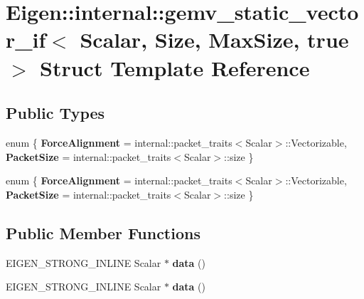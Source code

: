 \hypertarget{struct_eigen_1_1internal_1_1gemv__static__vector__if_3_01_scalar_00_01_size_00_01_max_size_00_01true_01_4}{}\section{Eigen\+:\+:internal\+:\+:gemv\+\_\+static\+\_\+vector\+\_\+if$<$ Scalar, Size, Max\+Size, true $>$ Struct Template Reference}
\label{struct_eigen_1_1internal_1_1gemv__static__vector__if_3_01_scalar_00_01_size_00_01_max_size_00_01true_01_4}
\subsection*{Public Types}
\begin{DoxyCompactItemize}
\item 
\mbox{\label{struct_eigen_1_1internal_1_1gemv__static__vector__if_3_01_scalar_00_01_size_00_01_max_size_00_01true_01_4_a79f51f46884656fafb63b74f0dd46069}} 
enum \{ {\bfseries Force\+Alignment} = internal\+:\+:packet\+\_\+traits$<$Scalar$>$\+:\+:Vectorizable, 
{\bfseries Packet\+Size} = internal\+:\+:packet\+\_\+traits$<$Scalar$>$\+:\+:size
 \}
\item 
\mbox{\label{struct_eigen_1_1internal_1_1gemv__static__vector__if_3_01_scalar_00_01_size_00_01_max_size_00_01true_01_4_a45a550706bfd47c2a79ff5f549209905}} 
enum \{ {\bfseries Force\+Alignment} = internal\+:\+:packet\+\_\+traits$<$Scalar$>$\+:\+:Vectorizable, 
{\bfseries Packet\+Size} = internal\+:\+:packet\+\_\+traits$<$Scalar$>$\+:\+:size
 \}
\end{DoxyCompactItemize}
\subsection*{Public Member Functions}
\begin{DoxyCompactItemize}
\item 
\mbox{\label{struct_eigen_1_1internal_1_1gemv__static__vector__if_3_01_scalar_00_01_size_00_01_max_size_00_01true_01_4_a5b112b500e6277a2398e5183ab764f40}} 
E\+I\+G\+E\+N\+\_\+\+S\+T\+R\+O\+N\+G\+\_\+\+I\+N\+L\+I\+NE Scalar $\ast$ {\bfseries data} ()
\item 
\mbox{\label{struct_eigen_1_1internal_1_1gemv__static__vector__if_3_01_scalar_00_01_size_00_01_max_size_00_01true_01_4_a5b112b500e6277a2398e5183ab764f40}} 
E\+I\+G\+E\+N\+\_\+\+S\+T\+R\+O\+N\+G\+\_\+\+I\+N\+L\+I\+NE Scalar $\ast$ {\bfseries data} ()
\end{DoxyCompactItemize}
